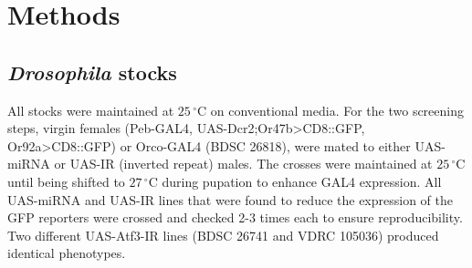 \section*{Methods}

\subsection*{\emph{Drosophila} stocks}

All stocks were maintained at $25\,^{\circ}\mathrm{C}$ on conventional media.
For the two screening steps, virgin females (Peb-GAL4, UAS-Dcr2;Or47b\textgreater{}CD8::GFP, Or92a\textgreater{}CD8::GFP) or Orco-GAL4 (BDSC 26818), were mated to either UAS-miRNA or UAS-IR (inverted repeat) males.
The crosses were maintained at $25\,^{\circ}\mathrm{C}$ until being shifted to $27\,^{\circ}\mathrm{C}$ during pupation to enhance GAL4 expression.
All UAS-miRNA and UAS-IR lines that were found to reduce the expression of the GFP reporters were crossed and checked 2-3 times each to ensure reproducibility.
Two different UAS-Atf3-IR lines (BDSC 26741 and VDRC 105036) produced identical phenotypes.